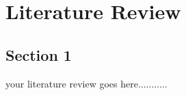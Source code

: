 \chapter{Literature Review}  %

\section{Section 1} %

 

 

your literature review goes here........... 

